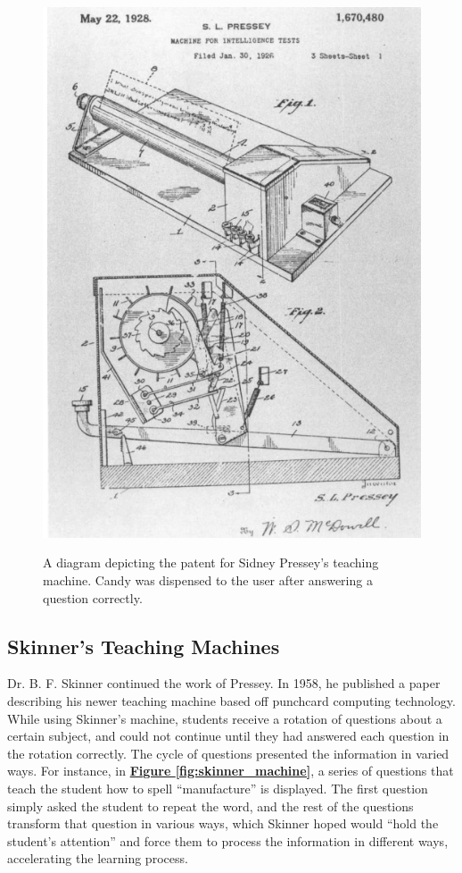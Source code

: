  \begin{figure}[h]
 	\includegraphics[width=1.0\linewidth]{figures/pressey_machine}
 	\caption{A diagram depicting the patent for Sidney Pressey's teaching machine. Candy was dispensed to the user after answering a question correctly.}
 	\label{fig:pressey_machine}
 	\cite{benjamin1988history}
 \end{figure}
 
 \subsection{Skinner's Teaching Machines}
 \par Dr. B. F. Skinner continued the work of Pressey. In 1958, he published a paper describing his newer teaching machine based off punchcard computing technology. While using Skinner's machine, students receive a rotation of questions about a certain subject, and could not continue until they had answered each question in the rotation correctly. The cycle of questions presented the information in varied ways. For instance, in \textbf{\hyperref[fig:skinner_machine]{Figure \ref*{fig:skinner_machine}}}, a series of questions that teach the student how to spell ``manufacture'' is displayed. The first question simply asked the student to repeat the word, and the rest of the questions transform that question in various ways, which Skinner hoped would ``hold the student's attention'' and force them to process the information in different ways, accelerating the learning process. 
 
